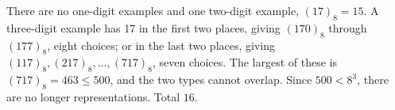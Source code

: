 There are no one-digit examples and one two-digit example, $(17)_8=15 $. A three-digit example has 17 in the first two places, giving $(170)_8 $ through $(177)_8 $, eight choices; or in the last two places, giving $(117)_8,(217)_8,\ldots,(717)_8 $, seven choices. The largest of these is $(717)_8=463\le500 $, and the two types cannot overlap. Since $ 500<8^3 $, there are no longer representations. Total $\boxed{16}$.
